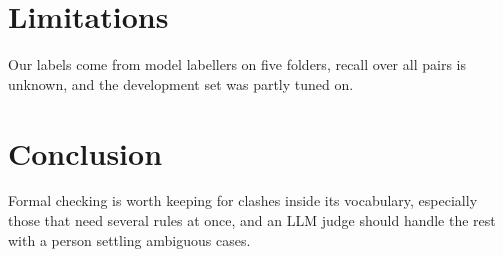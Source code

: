 \documentclass[11pt]{article}
\begin{document}
\section{Limitations}
Our labels come from model labellers on five folders, recall over all pairs is unknown, and the
development set was partly tuned on.

\section{Conclusion}
Formal checking is worth keeping for clashes inside its vocabulary, especially those that need
several rules at once, and an LLM judge should handle the rest with a person settling ambiguous
cases.
\end{document}
